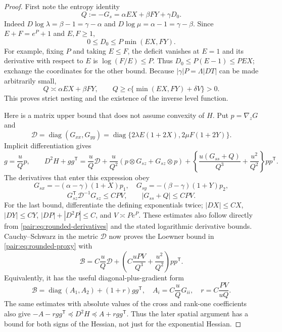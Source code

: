 \documentclass[11pt]{article}
\numberwithin{equation}{section}
\begin{document}
\begin{proof}
First note the entropy identity
\begin{equation}\label{pair:eq:rounded-Q}
 Q:=-G_s=\alpha EX+\beta FY+\gamma D_0.
\end{equation}
Indeed $D\log\lambda=\beta-1=\gamma-\alpha$ and
$D\log\mu=\alpha-1=\gamma-\beta$.
Since $E+F=e^P+1$ and $E,F\ge1$,
\begin{equation}\label{pair:eq:entropy-deficit}
 0\le D_0\le P\min(EX,FY).
\end{equation}
For example, fixing $P$ and taking $E\le F$, the deficit vanishes at
$E=1$ and its derivative with respect to $E$ is $\log(F/E)\le P$.
Thus $D_0\le P(E-1)\le P EX$; exchange the coordinates for the other
bound. Because $|\gamma|P=\Lambda|DT|$ can be made arbitrarily small,
\begin{equation}\label{pair:eq:Q-comparability}
 Q\asymp\alpha EX+\beta FY,
 \qquad Q\ge c\{\min(EX,FY)+\delta V\}>0.
\end{equation}
This proves strict nesting and the existence of the inverse level
function.

Here is a matrix upper bound that does not assume convexity of $H$.
Put $p=\nabla_zG$ and
\[
 \mathcal D=\operatorname{diag}(G_{xx},G_{yy})
 =\operatorname{diag}\{2\lambda E(1+2X),
                         2\mu F(1+2Y)\}.
\]
Implicit differentiation gives
\begin{equation}\label{pair:eq:implicit-Hessian}
 g=\frac uQp,\qquad
 D^2H+gg^{\mathsf T}
 =\frac uQ\mathcal D
   +\frac u{Q^2}(p\otimes G_{sz}+G_{sz}\otimes p)
   +\left\{\frac{u(G_{ss}+Q)}{Q^3}
                                +\frac{u^2}{Q^2}\right\}pp^{\mathsf T}.
\end{equation}
The derivatives that enter this expression obey
\begin{equation}\label{pair:eq:rounded-derivatives}
 G_{sx}=-(\alpha-\gamma)(1+X)p_1,
 \quad G_{sy}=-(\beta-\gamma)(1+Y)p_2,
\end{equation}
\[
 G_{sz}^{\mathsf T}\mathcal D^{-1}G_{sz}\le C P V,
 \qquad |G_{ss}+Q|\le C P V.
\]
For the last bound, differentiate the defining exponentials twice;
$|DX|\le CX$, $|DY|\le CY$, $|DP|+|D^2P|\le C$, and
$V\asymp P e^P$. These estimates also follow directly from
\eqref{pair:eq:rounded-derivatives} and the stated logarithmic derivative
bounds. Cauchy--Schwarz in the metric $\mathcal D$ now proves the
Loewner bound in \eqref{pair:eq:rounded-proxy} with
\begin{equation}\label{pair:eq:explicit-proxy}
 \mathcal B=
 C\frac uQ\mathcal D+
 \left(C\frac{uPV}{Q^3}+\frac{u^2}{Q^2}\right)pp^{\mathsf T}.
\end{equation}
Equivalently, it has the useful diagonal-plus-gradient form
\[
 \mathcal B=\operatorname{diag}(A_1,A_2)+(1+r)gg^{\mathsf T},
 \quad A_i=C\frac uQG_{ii},\quad r=C\frac{PV}{uQ}.
\]
The same estimates with absolute values of the cross and rank-one
coefficients also give $-A-rgg^{\mathsf T}\preceq D^2H\preceq
A+rgg^{\mathsf T}$. Thus the later spatial argument has a bound for
both signs of the Hessian, not just for the exponential Hessian.


\end{proof}
\end{document}

